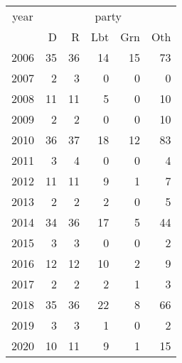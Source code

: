 \footnotesize\begin{tabular}[t]{lrrrrr}
\toprule
\multicolumn{1}{c}{year} & \multicolumn{5}{c}{party} \\
\cmidrule(l{3pt}r{3pt}){1-1} \cmidrule(l{3pt}r{3pt}){2-6}
  & D & R & Lbt & Grn & Oth\\
\midrule
2006 & 35 & 36 & 14 & 15 & 73\\
2007 & 2 & 3 & 0 & 0 & 0\\
2008 & 11 & 11 & 5 & 0 & 10\\
2009 & 2 & 2 & 0 & 0 & 10\\
2010 & 36 & 37 & 18 & 12 & 83\\
2011 & 3 & 4 & 0 & 0 & 4\\
2012 & 11 & 11 & 9 & 1 & 7\\
2013 & 2 & 2 & 2 & 0 & 5\\
2014 & 34 & 36 & 17 & 5 & 44\\
2015 & 3 & 3 & 0 & 0 & 2\\
2016 & 12 & 12 & 10 & 2 & 9\\
2017 & 2 & 2 & 2 & 1 & 3\\
2018 & 35 & 36 & 22 & 8 & 66\\
2019 & 3 & 3 & 1 & 0 & 2\\
2020 & 10 & 11 & 9 & 1 & 15\\
\bottomrule
\end{tabular}
